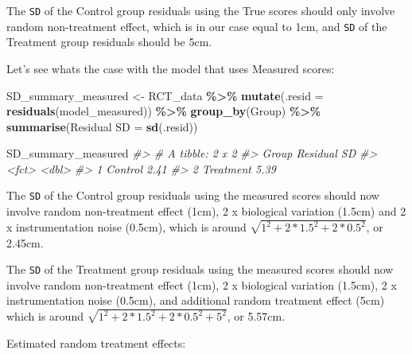 \documentclass[
]{book}
\newenvironment{Shaded}{\begin{snugshade}}{\end{snugshade}}
\newcommand{\CommentTok}[1]{\textcolor[rgb]{0.56,0.35,0.01}{\textit{#1}}}
\newcommand{\DataTypeTok}[1]{\textcolor[rgb]{0.13,0.29,0.53}{#1}}
\newcommand{\DecValTok}[1]{\textcolor[rgb]{0.00,0.00,0.81}{#1}}
\newcommand{\KeywordTok}[1]{\textcolor[rgb]{0.13,0.29,0.53}{\textbf{#1}}}
\newcommand{\NormalTok}[1]{#1}
\newcommand{\OperatorTok}[1]{\textcolor[rgb]{0.81,0.36,0.00}{\textbf{#1}}}
\newcommand{\StringTok}[1]{\textcolor[rgb]{0.31,0.60,0.02}{#1}}
\begin{document}
The \texttt{SD} of the Control group residuals using the True scores should only involve random non-treatment effect, which is in our case equal to 1cm, and \texttt{SD} of the Treatment group residuals should be 5cm.

Let's see whats the case with the model that uses Measured scores:

\begin{Shaded}
\begin{Highlighting}[]
\NormalTok{SD\_summary\_measured <{-}}\StringTok{ }\NormalTok{RCT\_data }\OperatorTok{\%>\%}
\StringTok{  }\KeywordTok{mutate}\NormalTok{(}\DataTypeTok{.resid =} \KeywordTok{residuals}\NormalTok{(model\_measured)) }\OperatorTok{\%>\%}
\StringTok{  }\KeywordTok{group\_by}\NormalTok{(Group) }\OperatorTok{\%>\%}
\StringTok{  }\KeywordTok{summarise}\NormalTok{(}\StringTok{\textasciigrave{}}\DataTypeTok{Residual SD}\StringTok{\textasciigrave{}}\NormalTok{ =}\StringTok{ }\KeywordTok{sd}\NormalTok{(.resid))}


\NormalTok{SD\_summary\_measured}
\CommentTok{\#> \# A tibble: 2 x 2}
\CommentTok{\#>   Group     \textasciigrave{}Residual SD\textasciigrave{}}
\CommentTok{\#>   <fct>             <dbl>}
\CommentTok{\#> 1 Control            2.41}
\CommentTok{\#> 2 Treatment          5.39}
\end{Highlighting}
\end{Shaded}

The \texttt{SD} of the Control group residuals using the measured scores should now involve random non-treatment effect (1cm), 2 x biological variation (1.5cm) and 2 x instrumentation noise (0.5cm), which is around \(\sqrt{1^2 + 2*1.5^2 + 2*0.5^2}\), or 2.45cm.

The \texttt{SD} of the Treatment group residuals using the measured scores should now involve random non-treatment effect (1cm), 2 x biological variation (1.5cm), 2 x instrumentation noise (0.5cm), and additional random treatment effect (5cm) which is around \(\sqrt{1^2 + 2*1.5^2 + 2*0.5^2 + 5^2}\), or 5.57cm.

Estimated random treatment effects:

\begin{Shaded}
\end{Shaded}
\end{document}
